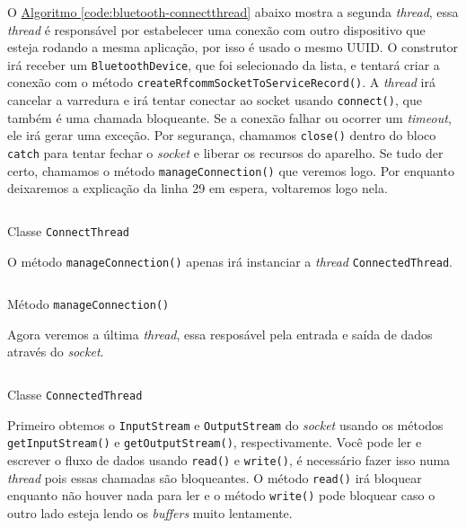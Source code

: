\documentclass[a4paper,12pt,brazil,oneside]{book}
\begin{document}
	O \hyperref[code:bluetooth-connectthread]{Algoritmo \ref*{code:bluetooth-connectthread}} abaixo mostra a segunda \emph{thread}, essa \emph{thread} é responsável por estabelecer uma conexão com outro dispositivo que esteja rodando a mesma aplicação, por isso é usado o mesmo UUID. O construtor irá receber um \texttt{BluetoothDevice}, que foi selecionado da lista, e tentará criar a conexão com o método \texttt{createRfcommSocketToServiceRecord()}. A \emph{thread} irá cancelar a varredura e irá tentar conectar ao socket usando \texttt{connect()}, que também é uma chamada bloqueante. Se a conexão falhar ou ocorrer um \emph{timeout}, ele irá gerar uma exceção. Por segurança, chamamos \texttt{close()} dentro do bloco \texttt{catch} para tentar fechar o \emph{socket} e liberar os recursos do aparelho. Se tudo der certo, chamamos o método \texttt{manageConnection()} que veremos logo. Por enquanto deixaremos a explicação da linha 29 em espera, voltaremos logo nela.

	\begin{listing}[H]
	\inputminted[linenos=true,fontsize=\small,frame=lines, framesep=2mm, tabsize=2,numbersep=5pt]{java}{src/api/bluetooth/connectthread.java}
	\caption{Classe \texttt{ConnectThread}}
	\label{code:bluetooth-connectthread}
	\end{listing} 	

	O método \texttt{manageConnection()} apenas irá instanciar a \emph{thread} \texttt{ConnectedThread}.

	\begin{listing}[H]
	\inputminted[linenos=true,fontsize=\small,frame=lines, framesep=2mm, tabsize=2,numbersep=5pt]{java}{src/api/bluetooth/manage.java}
	\caption{Método \texttt{manageConnection()}}
	\label{code:bluetooth-manage}
	\end{listing} 	

	Agora veremos a última \emph{thread}, essa resposável pela entrada e saída de dados através do \emph{socket}.

	\begin{listing}[H]
	\inputminted[linenos=true,fontsize=\small,frame=lines, framesep=2mm, tabsize=2,numbersep=5pt]{java}{src/api/bluetooth/connected.java}
	\caption{Classe \texttt{ConnectedThread}}
	\label{code:bluetooth-connected}
	\end{listing} 	

	Primeiro obtemos o \texttt{InputStream} e \texttt{OutputStream} do \emph{socket} usando os métodos \texttt{getInputStream()} e \texttt{getOutputStream()}, respectivamente. Você pode ler e escrever o fluxo de dados usando \texttt{read()} e \texttt{write()}, é necessário fazer isso numa \emph{thread} pois essas chamadas são bloqueantes. O método \texttt{read()} irá bloquear enquanto não houver nada para ler e o método \texttt{write()} pode bloquear caso o outro lado esteja lendo os \emph{buffers} muito lentamente. 
\end{document}
